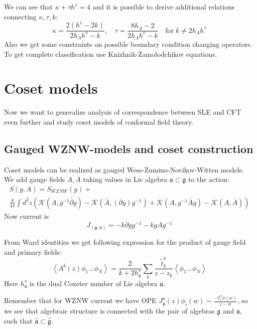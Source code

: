 \documentclass[12pt]{article}
\theoremstyle{definition}
\newcommand{\gf}{\mathfrak{g}}
\newcommand{\af}{\mathfrak{a}}
\newcommand{\gfh}{\hat{\mathfrak{g}}}
\newcommand{\afh}{\hat{\mathfrak{a}}}
\theoremstyle{definition} \newtheorem{Def}{Definition}
\begin{document}
We can see that $\kappa+\tau h^{v}=4$ and it is possible to derive additional relations connecting $\kappa, \tau, k$:
\begin{equation*}
  \kappa=\frac{2(h^{v}-2k)}{2h_{\Lambda}h^{v}-k},\quad \tau=\frac{8 h_{\Lambda}-2}{2h_{\Lambda}h^{v}-k}  \quad\text{for}\; k\neq 2h_{\Lambda}h^{v}
\end{equation*}
 Also we get some constraints on possible boundary condition changing operators. 
To get complete classification use Knizhnik-Zamolodchikov equations.


\section{Coset models}
\label{sec:coset-models}
Now we want to generalize analysis of correspondence between SLE and CFT even further and study coset models of conformal field theory.


\subsection{Gauged WZNW-models and coset construction}

Coset models can be realized as gauged Wess-Zumino-Novikov-Witten models. We add gauge fields  $A, \bar{A}$ taking values in Lie algebra $\af\subset \gf$ to the action:
\begin{multline*}
  S(g,A)=S_{WZNW}(g)+\\
  \frac{k}{4\pi}\int d^{2}z \left(\mathcal{K}(A, g^{-1}\bar \partial g)-\mathcal{K}(\bar A, (\partial g ) g^{-1})+\mathcal{K}(A,g^{-1}\bar A g)-\mathcal{K}(A,\bar A)\right)
\end{multline*}
Now current is
\begin{equation*}
  J_{(\gf,\af)}=-k\partial g g^{-1} -k g A g^{-1}
\end{equation*}

From Ward identities we get following expression for the product of gauge field and primary fields:
\begin{equation*}
  \left< A^{b}(z)\phi_{1}\dots \phi_{N}\right>=\frac{2}{k+2 h^{v}_{\af}}\sum_{k}\frac{\tilde{t}^{b}_{k}}{z-z_{k}}\left<\phi_{1}\dots \phi_{N}\right>
\end{equation*}
Here $h_{\af}^{v}$ is the dual Coxeter number of Lie algebra $\af$.

Remember that for WZNW current we have OPE $J_{\gf}^{a}(z)\phi_{i}(w)\sim \frac{-t^{a}_{i}\phi(w)}{z-w}$,  so we see that algebraic structure is connected with the pair of algebras $\gf$ and $\af$, such that $\afh\subset\gfh$. 
\end{document}
